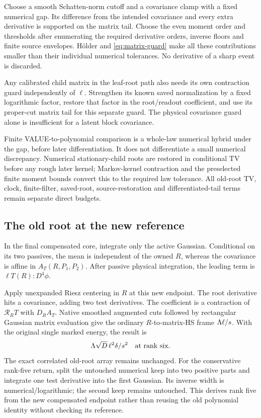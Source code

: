 \documentclass[11pt]{article}
\numberwithin{equation}{section}
\theoremstyle{remark}\newtheorem{remark}[theorem]{Remark}
\newcommand{\cR}{\mathcal R}\newcommand{\dd}{\,\mathrm d}
\begin{document}
Choose a smooth Schatten-norm cutoff and a covariance clamp with a fixed numerical gap. Its difference from the intended covariance and every extra derivative is supported on the matrix tail. Choose the even moment order and thresholds after enumerating the required derivative orders, inverse floors and finite source envelopes. H\"older and \eqref{eq:matrix-guard} make all these contributions smaller than their individual numerical tolerances. No derivative of a sharp event is discarded.

Any calibrated child matrix in the leaf-root path also needs its own contraction guard independently of $\ell$. Strengthen its known saved normalization by a fixed logarithmic factor, restore that factor in the root/readout coefficient, and use its proper-cut matrix tail for this separate guard. The physical covariance guard alone is insufficient for a latent block covariance.

Finite VALUE-to-polynomial comparison is a whole-law numerical hybrid under the gap, before later differentiation. It does not differentiate a small numerical discrepancy. Numerical stationary-child roots are restored in conditional TV before any rough later kernel; Markov-kernel contraction and the preselected finite moment bounds convert this to the required law tolerance. All old-root TV, clock, finite-filter, saved-root, source-restoration and differentiated-tail terms remain separate direct budgets.

\subsection{The old root at the new reference}
In the final compensated core, integrate only the active Gaussian. Conditional on its two passives, the mean is independent of the owned $R$, whereas the covariance is affine in $A_T(R,P_1,P_2)$. After passive physical integration, the leading term is $\ell T(R):D^4\phi$.

Apply unexpanded Riesz centering in $R$ at this new endpoint. The root derivative hits a covariance, adding two test derivatives. The coefficient is a contraction of $\cR_RT$ with $D_RA_T$. Native smoothed augmented cuts followed by rectangular Gaussian matrix evaluation give the ordinary $R$-to-matrix-HS frame $\Lambda\ell/s$. With the original single marked energy, the result is
\begin{equation}\label{eq:owned-root}
 \Lambda\sqrt D\,\ell^2\delta/s^2\quad\hbox{at rank six}.
\end{equation}
The exact correlated old-root array remains unchanged. For the conservative rank-five return, split the untouched numerical keep into two positive parts and integrate one test derivative into the first Gaussian. Its inverse width is numerical/logarithmic; the second keep remains untouched. This derives rank five from the new compensated endpoint rather than reusing the old polynomial identity without checking its reference.
\end{document}
